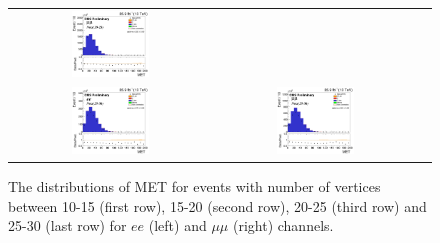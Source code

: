 \begin{figure}[ht]
\begin{center}
\begin{tabular}{ccc}
      \includegraphics[width=0.4\textwidth]{figures/tW/fig/Nvtx/20-25/mumu/H_MET_Et.png}\\
      \includegraphics[width=0.4\textwidth]{figures/tW/fig/Nvtx/25-30/ee/H_MET_Et.png}&
      \includegraphics[width=0.4\textwidth]{figures/tW/fig/Nvtx/25-30/mumu/H_MET_Et.png}\\
    \end{tabular}
    \caption{The distributions of MET for events with number of vertices between 10-15 (first row), 15-20 (second row), 20-25 (third row) and 25-30 (last row) for $ee$ (left) and $\mu\mu$ (right) channels.
    \label{fig:step1_MET_Nvtx}}
  \end{center}
\end{figure}


